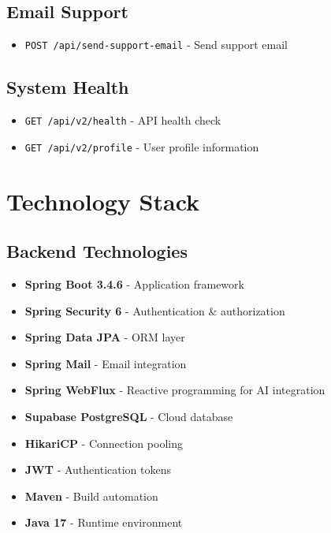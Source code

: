 \documentclass[11pt,a4paper]{article}
\begin{document}
\subsection{Email Support}
\begin{itemize}[leftmargin=*]
    \item \texttt{POST /api/send-support-email} - Send support email
\end{itemize}

\subsection{System Health}
\begin{itemize}[leftmargin=*]
    \item \texttt{GET /api/v2/health} - API health check
    \item \texttt{GET /api/v2/profile} - User profile information
\end{itemize}

\section{Technology Stack}

\subsection{Backend Technologies}
\begin{itemize}[leftmargin=*]
    \item \textbf{Spring Boot 3.4.6} - Application framework
    \item \textbf{Spring Security 6} - Authentication \& authorization
    \item \textbf{Spring Data JPA} - ORM layer
    \item \textbf{Spring Mail} - Email integration
    \item \textbf{Spring WebFlux} - Reactive programming for AI integration
    \item \textbf{Supabase PostgreSQL} - Cloud database
    \item \textbf{HikariCP} - Connection pooling
    \item \textbf{JWT} - Authentication tokens
    \item \textbf{Maven} - Build automation
    \item \textbf{Java 17} - Runtime environment
\end{itemize}
\end{document}
